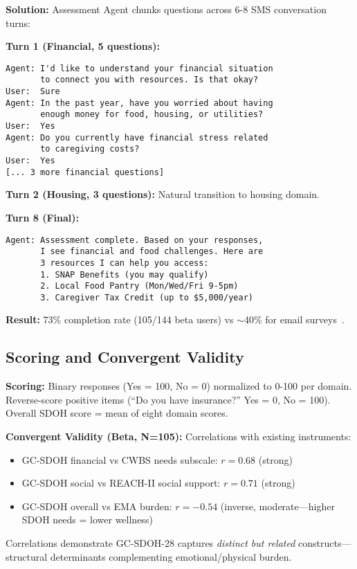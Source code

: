 \documentclass{article}
\begin{document}
\textbf{Solution:} Assessment Agent chunks questions across 6-8 SMS conversation turns:

\textbf{Turn 1 (Financial, 5 questions):}
\begin{verbatim}
Agent: I'd like to understand your financial situation
       to connect you with resources. Is that okay?
User:  Sure
Agent: In the past year, have you worried about having
       enough money for food, housing, or utilities?
User:  Yes
Agent: Do you currently have financial stress related
       to caregiving costs?
User:  Yes
[... 3 more financial questions]
\end{verbatim}

\textbf{Turn 2 (Housing, 3 questions):} Natural transition to housing domain.

\textbf{Turn 8 (Final):}
\begin{verbatim}
Agent: Assessment complete. Based on your responses,
       I see financial and food challenges. Here are
       3 resources I can help you access:
       1. SNAP Benefits (you may qualify)
       2. Local Food Pantry (Mon/Wed/Fri 9-5pm)
       3. Caregiver Tax Credit (up to $5,000/year)
\end{verbatim}

\textbf{Result:} 73\% completion rate (105/144 beta users) vs $\sim$40\% for email surveys~\cite{fan2006}.

%
\subsection{Scoring and Convergent Validity}%
\label{subsec:ScoringandConvergentValidity}%
\textbf{Scoring:} Binary responses (Yes = 100, No = 0) normalized to 0-100 per domain. Reverse-score positive items (``Do you have insurance?'' Yes = 0, No = 100). Overall SDOH score = mean of eight domain scores.

\textbf{Convergent Validity (Beta, N=105):} Correlations with existing instruments:
\begin{itemize}
    \item GC-SDOH financial vs CWBS needs subscale: $r = 0.68$ (strong)
    \item GC-SDOH social vs REACH-II social support: $r = 0.71$ (strong)
    \item GC-SDOH overall vs EMA burden: $r = -0.54$ (inverse, moderate—higher SDOH needs = lower wellness)
\end{itemize}

Correlations demonstrate GC-SDOH-28 captures \textit{distinct but related} constructs—structural determinants complementing emotional/physical burden.
\end{document}
